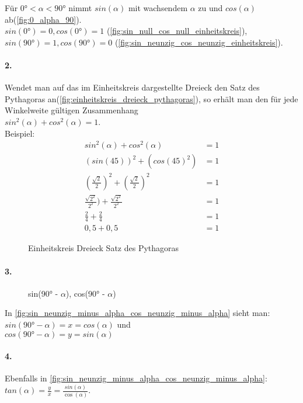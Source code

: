 \documentclass[12pt,a4paper]{article}
\begin{document}
\noindent Für $0° < \alpha < 90°$ nimmt $sin(\alpha)$ mit wachsendem $\alpha$ zu und $cos(\alpha)$ ab(\autoref{fig:0_alpha_90}). \\
$sin(0°) = 0, cos(0°) = 1$ (\autoref{fig:sin_null_cos_null_einheitskreis}), $sin(90°) = 1, cos(90°) = 0$ (\autoref{fig:sin_neunzig_cos_neunzig_einheitskreis}).
\newpage
\paragraph{2.} 
Wendet man auf das im Einheitskreis dargestellte Dreieck den Satz des Pythagoras an(\autoref{fig:einheitskreis_dreieck_pythagoras}), so erhält man den für jede Winkelweite gültigen Zusammenhang \\
$sin^2(\alpha) + cos^2(\alpha) = 1$. \\
Beispiel:
\begin{align}
	sin^2(\alpha) + cos^2(\alpha) &= 1 \tag{1} \\ 
	(sin(45))^2 + (cos(45)^2) &= 1  \tag{2}\\
	(\frac{\sqrt{2}}{2})^2 + (\frac{\sqrt{2}}{2})^2 &= 1 \tag{3}\\
	\frac{\sqrt{2^2}}{2^2}) + \frac{\sqrt{2^2}}{2^2} &= 1 \tag{4}\\
	\frac{2}{4} + \frac{2}{4} &= 1 \tag{5}\\
	0,5 + 0,5 &= 1 \tag{6}
\end{align}

\begin{figure}[hb!]
	\center
	\def\svgwidth{200px}
    
    \caption{Einheitskreis Dreieck Satz des Pythagoras}
  	\label{fig:einheitskreis_dreieck_pythagoras}
\end{figure}
\paragraph{3.}
\begin{wrapfigure}[6]{r}{0.45\textwidth}
	\def\svgwidth{200px}
    
    \caption{sin(90° - $\alpha$), cos(90° - $\alpha$)}
  	\label{fig:sin_neunzig_minus_alpha_cos_neunzig_minus_alpha}
\end{wrapfigure}
In \autoref{fig:sin_neunzig_minus_alpha_cos_neunzig_minus_alpha} sieht man: \\
$sin(90° - \alpha) = x = cos(\alpha)$ und \\
$cos(90° - \alpha) = y = sin(\alpha)$
\paragraph{4.}
Ebenfalls in \autoref{fig:sin_neunzig_minus_alpha_cos_neunzig_minus_alpha}:\\
$tan(\alpha) = \frac{y}{x} = \frac{sin(\alpha)}{\cos(\alpha)}$.
\newpage
\end{document}
